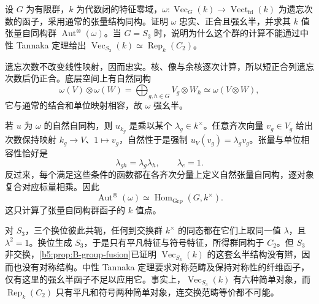 \begin{exercise}\label{b5:ex:B:15}
	设 \(G\) 为有限群，\(k\) 为代数闭的特征零域，\(\omega:\operatorname{Vec}_G(k)\to\operatorname{Vect}_{\mathrm{fd}}(k)\) 为遗忘次数的函子，采用通常的张量结构同构。证明 \(\omega\) 忠实、正合且强幺半，并求其 \(k\) 值张量自同构群 \(\operatorname{Aut}^{\otimes}(\omega)\)。当 \(G=S_3\) 时，说明为什么这个群的计算不能通过中性 Tannaka 定理给出 \(\operatorname{Vec}_{S_3}(k)\simeq\operatorname{Rep}_k(C_2)\)。
\end{exercise}
\begin{solution}
	遗忘次数不改变线性映射，因而忠实。核、像与余核逐次计算，所以短正合列遗忘次数后仍正合。底层空间上有自然同构
	\[
		\omega(V)\otimes\omega(W)
		=\bigoplus_{g,h\in G}V_g\otimes W_h
		\simeq\omega(V\otimes W),
	\]
	它与通常的结合和单位映射相容，故 \(\omega\) 强幺半。

	若 \(u\) 为 \(\omega\) 的自然自同构，则 \(u_{k_g}\) 是乘以某个 \(\lambda_g\in k^\times\)。任意齐次向量 \(v_g\in V_g\) 给出次数保持映射 \(k_g\to V\)、\(1\mapsto v_g\)，自然性于是强制 \(u_V(v_g)=\lambda_gv_g\)。张量与单位相容性恰好是
	\[
		\lambda_{gh}=\lambda_g\lambda_h,\qquad\lambda_e=1.
	\]
	反过来，每个满足这些条件的函数都在各齐次分量上定义自然张量自同构，逐对象复合对应标量相乘。因此
	\[
		\operatorname{Aut}^{\otimes}(\omega)
		\simeq\operatorname{Hom}_{\mathrm{Grp}}(G,k^\times).
	\]
	这只计算了张量自同构群函子的 \(k\) 值点。

	对 \(S_3\)，三个换位彼此共轭，任何到交换群 \(k^\times\) 的同态都在它们上取同一值 \(\lambda\)，且 \(\lambda^2=1\)。换位生成 \(S_3\)，于是只有平凡特征与符号特征，所得群同构于 \(C_2\)。但 \(S_3\) 非交换，\cref{b5:prop:B-group-fusion}已证明 \(\operatorname{Vec}_{S_3}(k)\) 的这套幺半结构没有辫，因而也没有对称结构。中性 Tannaka 定理要求对称范畴及保持对称性的纤维函子，仅有这里的强幺半函子不足以应用它。事实上，\(\operatorname{Vec}_{S_3}(k)\) 有六种简单对象，而 \(\operatorname{Rep}_k(C_2)\) 只有平凡和符号两种简单对象，连交换范畴等价都不可能。
\end{solution}

